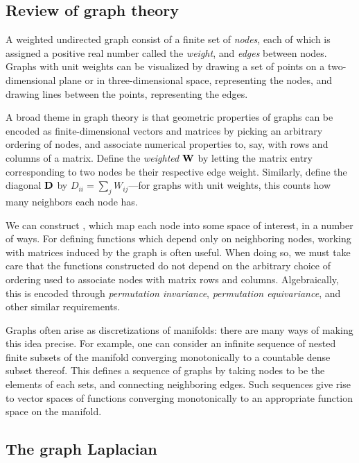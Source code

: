 \documentclass[11pt]{book}
\begin{document}
\subsection{Review of graph theory}

A weighted undirected graph consist of a finite set of \emph{nodes}, each of which is assigned a positive real number called the \emph{weight}, and \emph{edges} between nodes.
Graphs with unit weights can be visualized by drawing a set of points on a two-dimensional plane or in three-dimensional space, representing the nodes, and drawing lines between the points, representing the edges.

A broad theme in graph theory is that geometric properties of graphs can be encoded as finite-dimensional vectors and matrices by picking an arbitrary ordering of nodes, and associate numerical properties to, say, with rows and columns of a matrix.
Define the \emph{weighted } $\m{W}$ by letting the matrix entry corresponding to two nodes be their respective edge weight.
Similarly, define the diagonal  $\m{D}$ by $D_{ii} = \sum_j W_{ij}$---for graphs with unit weights, this counts how many neighbors each node has.

We can construct , which map each node into some space of interest, in a number of ways.
For defining functions which depend only on neighboring nodes, working with matrices induced by the graph is often useful.
When doing so, we must take care that the functions constructed do not depend on the arbitrary choice of ordering used to associate nodes with matrix rows and columns. Algebraically, this is encoded through \emph{permutation invariance}, \emph{permutation equivariance}, and other similar requirements.


Graphs often arise as discretizations of manifolds: there are many ways of making this idea precise.
For example, one can consider an infinite sequence of nested finite subsets of the manifold converging monotonically to a countable dense subset thereof.
This defines a sequence of graphs by taking nodes to be the elements of each sets, and connecting neighboring edges.
Such sequences give rise to vector spaces of functions converging monotonically to an appropriate function space on the manifold.

\subsection{The graph Laplacian}
\end{document}

